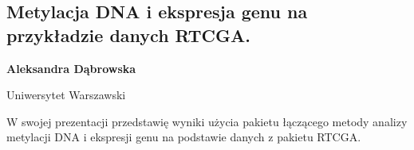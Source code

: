 \documentclass[\main/boa.tex]{subfiles}
\begin{document}
\subsection{Metylacja DNA i ekspresja genu na przykładzie danych RTCGA.}

\begin{minipage}{0.915\textwidth}
	\centering
  {\bf {} Aleksandra Dąbrowska}
\end{minipage}

\vskip 0.3cm

\begin{affiliations}
\begin{minipage}{0.915\textwidth}
\centering
Uniwersytet Warszawski \\[-2pt]
\end{minipage}
\end{affiliations}

\vskip 0.8cm

W swojej prezentacji przedstawię wyniki użycia pakietu łączącego metody analizy metylacji DNA i ekspresji genu na podstawie danych z pakietu RTCGA. 
\end{document}
